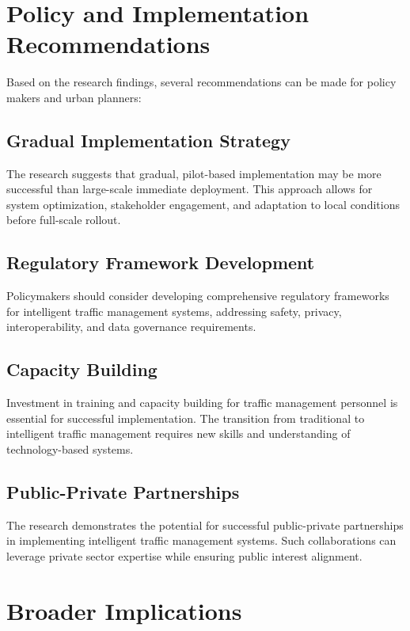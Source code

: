 \section{Policy and Implementation Recommendations}
\label{sec:recommendations}

Based on the research findings, several recommendations can be made for policy makers and urban planners:

\subsection{Gradual Implementation Strategy}
The research suggests that gradual, pilot-based implementation may be more successful than large-scale immediate deployment. This approach allows for system optimization, stakeholder engagement, and adaptation to local conditions before full-scale rollout.

\subsection{Regulatory Framework Development}
Policymakers should consider developing comprehensive regulatory frameworks for intelligent traffic management systems, addressing safety, privacy, interoperability, and data governance requirements.

\subsection{Capacity Building}
Investment in training and capacity building for traffic management personnel is essential for successful implementation. The transition from traditional to intelligent traffic management requires new skills and understanding of technology-based systems.

\subsection{Public-Private Partnerships}
The research demonstrates the potential for successful public-private partnerships in implementing intelligent traffic management systems. Such collaborations can leverage private sector expertise while ensuring public interest alignment.

\section{Broader Implications}
\label{sec:broader_implications}

